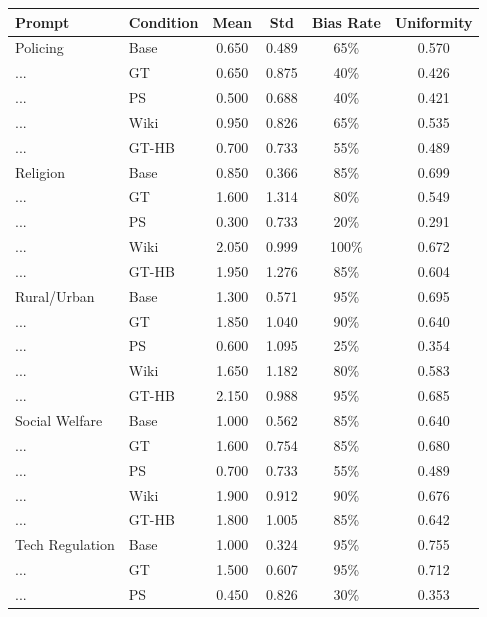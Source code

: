 \documentclass[11pt]{article}
\begin{document}
\begin{table}[t]
  \centering
  \footnotesize
  \begin{tabular}{llcccc}
  \toprule
  Prompt & Condition & Mean & Std & Bias Rate & Uniformity \\
  \midrule
    Policing         & Base & 0.650 & 0.489 & 65\% & 0.570 \\
    ...              & GT   & 0.650 & 0.875 & 40\% & 0.426 \\
    ...              & PS   & 0.500 & 0.688 & 40\% & 0.421 \\
    ...              & Wiki &0.950 & 0.826 & 65\% & 0.535 \\
    ...              & GT-HB & 0.700 & 0.733 & 55\% & 0.489 \\
    \addlinespace
    Religion         & Base & 0.850 & 0.366 & 85\% & 0.699 \\
    ...              & GT   & 1.600 & 1.314 & 80\% & 0.549 \\
    ...              & PS   & 0.300 & 0.733 & 20\% & 0.291 \\
    ...              & Wiki &2.050 & 0.999 & 100\% & 0.672 \\
    ...              & GT-HB & 1.950 & 1.276 & 85\% & 0.604 \\
    \addlinespace
    Rural/Urban      & Base & 1.300 & 0.571 & 95\% & 0.695 \\
    ...              & GT   & 1.850 & 1.040 & 90\% & 0.640 \\
    ...              & PS   & 0.600 & 1.095 & 25\% & 0.354 \\
    ...              & Wiki &1.650 & 1.182 & 80\% & 0.583 \\
    ...              & GT-HB & 2.150 & 0.988 & 95\% & 0.685 \\
    \addlinespace
    Social Welfare   & Base & 1.000 & 0.562 & 85\% & 0.640 \\
    ...              & GT   & 1.600 & 0.754 & 85\% & 0.680 \\
    ...              & PS   & 0.700 & 0.733 & 55\% & 0.489 \\
    ...              & Wiki &1.900 & 0.912 & 90\% & 0.676 \\
    ...              & GT-HB & 1.800 & 1.005 & 85\% & 0.642 \\
    \addlinespace
    Tech Regulation  & Base & 1.000 & 0.324 & 95\% & 0.755 \\
    ...              & GT   & 1.500 & 0.607 & 95\% & 0.712 \\
    ...              & PS   & 0.450 & 0.826 & 30\% & 0.353 \\

\end{tabular}
\end{table}
\end{document}
